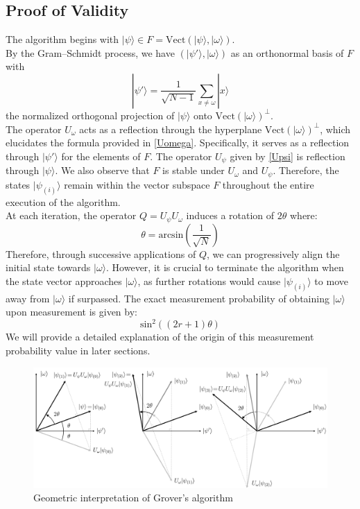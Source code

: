 
\subsection{Proof of Validity}

The algorithm begins with $|\psi \rangle \in F = \mathrm{Vect}(|\psi \rangle , |\omega \rangle )$. 
\\[5pt]
By the Gram–Schmidt process, we have $(|\psi' \rangle, | \omega \rangle)$ as an orthonormal basis of $F$ with 
\[|\psi'\rangle = \frac{1}{\sqrt{N-1}}\sum_{x \neq \omega} |x \rangle\]
the normalized orthogonal projection of $|\psi \rangle$ onto $\mathrm{Vect}(|\omega \rangle )^{\perp}$. 
\\[5pt]
The operator $U_{\omega}$ acts as a reflection through the hyperplane $\mathrm{Vect}(|\omega \rangle)^{\perp}$, which elucidates the formula provided in \eqref{Uomega}. Specifically, it serves as a reflection through  $|\psi'\rangle$ for the elements of $F$.
The operator $U_{\psi}$ given by \eqref{Upsi} is reflection through $|\psi\rangle$.
We also observe that $F$ is stable under $U_{\omega}$ and $U_{\psi}$. Therefore, the states $|\psi_{(i)} \rangle$ remain within the vector subspace $F$ throughout the entire execution of the algorithm.
\\[5pt]
At each iteration, the operator $Q=U_{\psi} U_{\omega}$ induces a rotation of $2\theta$ where:
\[\theta = \mathrm{arcsin}(\frac{1}{\sqrt{N}})\]
Therefore, through successive applications of $Q$, we can progressively align the initial state towards $|\omega \rangle$.
However, it is crucial to terminate the algorithm when the state vector approaches $|\omega \rangle$, as further rotations would cause $|\psi_{(i)} \rangle$ to move away from $|\omega \rangle$ if surpassed.
The exact measurement probability of obtaining $|\omega\rangle$ upon measurement is given by:
\[\mathrm{sin}^2 \left( \left( 2r + 1 \right) \theta \right) \]
We will provide a detailed explanation of the origin of this measurement probability value in later sections.
\begin{figure}
\hspace{0.2cm}
\begin{adjustbox}{minipage=1.2\textwidth, center}
\includegraphics[scale=0.4]{GroverGeom.png}
\end{adjustbox}
\caption{Geometric interpretation of Grover's algorithm}
\label{fig:grover}
\end{figure}
